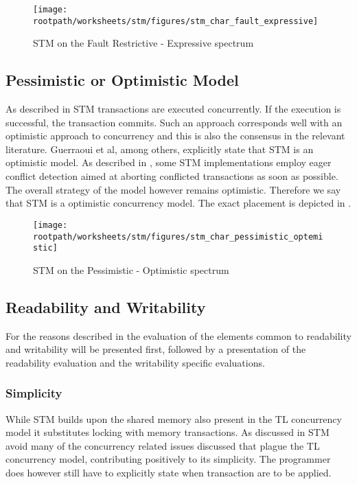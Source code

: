 \begin{figure}[htbp]
\centering
 \texttt{[image: \\rootpath/worksheets/stm/figures/stm\_char\_fault\_expressive]} 
 \caption{\ac{STM} on the Fault Restrictive - Expressive spectrum}
\label{fig:stm_char_fault_expressive}
\end{figure}

\subsection{Pessimistic or Optimistic Model}
As described in  \ac{STM} transactions are executed concurrently. If the execution is successful, the transaction commits. Such an approach corresponds well with an optimistic approach to concurrency and this is also the consensus in the relevant literature. Guerraoui et al, among others, explicitly state that \ac{STM} is an optimistic model\cite[p. 1]{guerraoui2005toward}. As described in , some \ac{STM} implementations employ eager conflict detection aimed at aborting conflicted transactions as soon as possible. The overall strategy of the model however remains optimistic. Therefore we say that \ac{STM} is a optimistic concurrency model. The exact placement is depicted in .

\begin{figure}[htbp]
\centering
 \texttt{[image: \\rootpath/worksheets/stm/figures/stm\_char\_pessimistic\_optemistic]} 
 \caption{\ac{STM} on the Pessimistic - Optimistic spectrum}
\label{fig:stm_char_pes_opti}
\end{figure}

\subsection{Readability and Writability}
For the reasons described in  the evaluation of the elements common to readability and writability will be presented first, followed by a presentation of the readability evaluation and the writability specific evaluations.

\subsubsection{Simplicity}
\label{subsec:stm_char_simplicity}
While \ac{STM} builds upon the shared memory also present in the \ac{TL} concurrency model it substitutes locking with memory transactions. As discussed in  \ac{STM} avoid many of the concurrency related issues discussed that plague the  \ac{TL} concurrency model, contributing positively to its simplicity. The programmer does however still have to explicitly state when transaction are to be applied.

